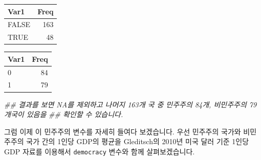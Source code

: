 \documentclass[]{book}
\newenvironment{Shaded}{\begin{snugshade}}{\end{snugshade}}
\newcommand{\CommentTok}[1]{\textcolor[rgb]{0.56,0.35,0.01}{\textit{#1}}}
\newcommand{\DataTypeTok}[1]{\textcolor[rgb]{0.13,0.29,0.53}{#1}}
\newcommand{\DecValTok}[1]{\textcolor[rgb]{0.00,0.00,0.81}{#1}}
\newcommand{\KeywordTok}[1]{\textcolor[rgb]{0.13,0.29,0.53}{\textbf{#1}}}
\newcommand{\NormalTok}[1]{#1}
\newcommand{\OperatorTok}[1]{\textcolor[rgb]{0.81,0.36,0.00}{\textbf{#1}}}
\newcommand{\OtherTok}[1]{\textcolor[rgb]{0.56,0.35,0.01}{#1}}
\newcommand{\StringTok}[1]{\textcolor[rgb]{0.31,0.60,0.02}{#1}}
\begin{document}
\begin{Shaded}
\end{Shaded}

\begin{tabular}{l|r}
\hline
Var1 & Freq\\
\hline
FALSE & 163\\
\hline
TRUE & 48\\
\hline
\end{tabular}

\begin{Shaded}
\end{Shaded}

\begin{tabular}{l|r}
\hline
Var1 & Freq\\
\hline
0 & 84\\
\hline
1 & 79\\
\hline
\end{tabular}

\begin{Shaded}
\begin{Highlighting}[]
\CommentTok{## 결과를 보면 NA를 제외하고 나머지 163개 국 중 민주주의 84개, 비민주주의 79개국이 있음을}
\CommentTok{## 확인할 수 있습니다.}
\end{Highlighting}
\end{Shaded}

그럼 이제 이 민주주의 변수를 자세히 들여다 보겠습니다. 우선 민주주의 국가와 비민주주의 국가 간의 1인당 GDP의 평균을 Gleditsch의 2010년 미국 달러 기준 1인당 GDP 자료를 이용해서 \texttt{democracy} 변수와 함께 살펴보겠습니다.

\begin{Shaded}
\end{Shaded}
\end{document}
